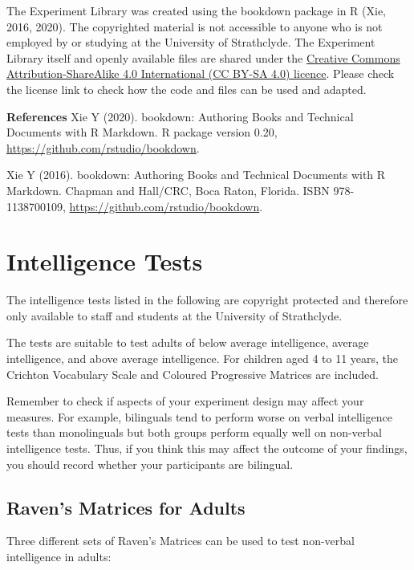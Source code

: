 \documentclass[
]{book}
\begin{document}
The Experiment Library was created using the bookdown package in R (Xie, 2016, 2020). The copyrighted material is not accessible to anyone who is not employed by or studying at the University of Strathclyde. The Experiment Library itself and openly available files are shared under the \href{https://creativecommons.org/licenses/by-sa/4.0/}{Creative Commons Attribution-ShareAlike 4.0 International (CC BY-SA 4.0) licence}. Please check the license link to check how the code and files can be used and adapted.

\textbf{References}
Xie Y (2020). bookdown: Authoring Books and Technical Documents with R Markdown. R package version 0.20, \url{https://github.com/rstudio/bookdown}.

Xie Y (2016). bookdown: Authoring Books and Technical Documents with R Markdown. Chapman and Hall/CRC, Boca Raton, Florida. ISBN 978-1138700109, \url{https://github.com/rstudio/bookdown}.

\hypertarget{intelligence-tests}{%
\chapter{Intelligence Tests}\label{intelligence-tests}}

The intelligence tests listed in the following are copyright protected and therefore only available to staff and students at the University of Strathclyde.

The tests are suitable to test adults of below average intelligence, average intelligence, and above average intelligence. For children aged 4 to 11 years, the Crichton Vocabulary Scale and Coloured Progressive Matrices are included.

Remember to check if aspects of your experiment design may affect your measures. For example, bilinguals tend to perform worse on verbal intelligence tests than monolinguals but both groups perform equally well on non-verbal intelligence tests. Thus, if you think this may affect the outcome of your findings, you should record whether your participants are bilingual.

\hypertarget{ravens-matrices-for-adults}{%
\section{Raven's Matrices for Adults}\label{ravens-matrices-for-adults}}

Three different sets of Raven's Matrices can be used to test non-verbal intelligence in adults:
\end{document}
